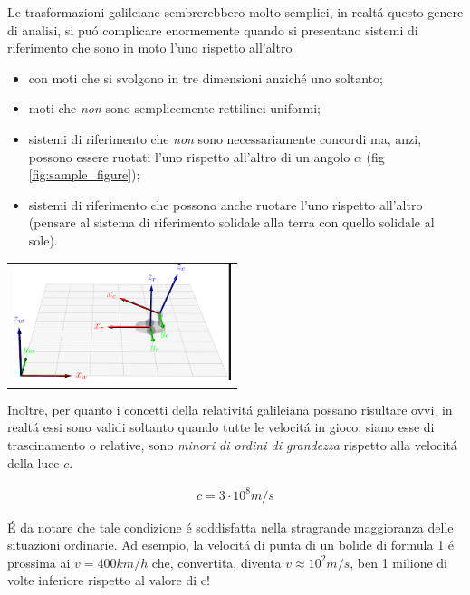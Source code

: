 \documentclass[17pt]{extarticle}
\begin{document}
Le trasformazioni galileiane sembrerebbero molto semplici, in realt\'a questo genere di analisi, si pu\'o complicare enormemente quando si presentano sistemi di riferimento che sono in moto l'uno rispetto all'altro 

\begin{itemize}
	\item con moti che si svolgono in tre dimensioni anzich\'e uno soltanto;
	\item moti che \emph{non} sono semplicemente rettilinei uniformi;
	\item sistemi di riferimento che \emph{non} sono necessariamente concordi ma, anzi, possono essere ruotati l'uno rispetto all'altro di un angolo $\alpha$ (fig \ref{fig:sample_figure});
	\item sistemi di riferimento che possono anche ruotare l'uno rispetto all'altro (pensare al sistema di riferimento solidale alla terra con quello solidale al sole).
\end{itemize}






\begin{tabular}{p{\textwidth}}		
	\centering
   	\includegraphics[width=2.5in]{SistRifDiscordi.png}
   	\label{fig:sample_figure}		
\end{tabular}



Inoltre, per quanto i concetti della relativit\'a galileiana possano risultare ovvi, in realt\'a essi sono validi soltanto quando tutte le velocit\'a in gioco, siano esse di trascinamento o relative, sono \emph{minori di ordini di grandezza} rispetto alla velocit\'a della luce $c$.

\begin{eqnarray}
	c = 3\cdot 10^8m/s
\end{eqnarray}

\'E da notare che tale condizione \'e soddisfatta nella stragrande maggioranza delle situazioni ordinarie. Ad esempio, la velocit\'a di punta di un bolide di formula 1 \'e prossima ai $v = 400km/h$ che, convertita, diventa $v\approx 10^2m/s$, ben 1 milione di volte inferiore rispetto al valore di c!
\end{document}
